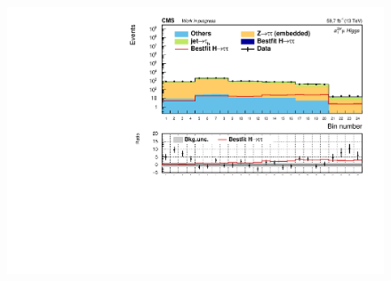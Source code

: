 \begin{figure}[!ht]
        \centering
        \includegraphics[scale=0.65]{Chapitre7/Images/histSig2018dp_postfit.pdf} 
        \vspace{0.5ex}
    \caption{}
    \label{SIGcategorydp}
\end{figure}


